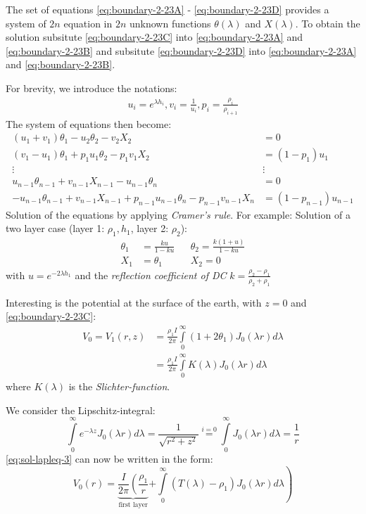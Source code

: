The set of equations \eqref{eq:boundary-2-23A} - \eqref{eq:boundary-2-23D} provides a system of $2n$ equation in $2n$ unknown functions $\theta(\lambda)$ and $X(\lambda)$. To obtain the solution subsitute \eqref{eq:boundary-2-23C} into \eqref{eq:boundary-2-23A} and \eqref{eq:boundary-2-23B} and subsitute \eqref{eq:boundary-2-23D} into \eqref{eq:boundary-2-23A} and \eqref{eq:boundary-2-23B}.

For brevity, we introduce the notations:
\begin{align*}
u_i=e^{\lambda h_i}, v_i=\frac{1}{u_i}, p_i=\frac{\rho_i}{\rho_{i+1}}
\end{align*}
The system of equations then become:
\begin{align*}
(u_1+v_1)\theta_1-u_2\theta_2-v_2X_2&=0\\
(v_1-u_1)\theta_1+p_1u_1\theta_2-p_1v_1X_2&=(1-p_1)u_1\\
\vdots~~~~~~~~~~~~~~~~~~~~&\vdots\\
u_{n-1}\theta_{n-1}+v_{n-1}X_{n-1}-u_{n-1}\theta_n&=0\\
-u_{n-1}\theta_{n-1}+v_{n-1}X_{n-1}+p_{n-1}u_{n-1}\theta_n-p_{n-1}v_{n-1}X_n&=(1-p_{n-1})u_{n-1}
\end{align*}
Solution of the equations by applying \textit{Cramer's rule}. For example: Solution of a two layer case (layer 1: $\rho_1, h_1$, layer 2: $\rho_2$):
\begin{align*}
\theta_1&=\frac{ku}{1-ku} && \theta_2=\frac{k(1+u)}{1-ku}\\
X_1&=\theta_1 && X_2=0
\end{align*}
with $u=e^{-2\lambda h_1}$ and the \textit{reflection coefficient of DC} $k=\frac{\rho_2-\rho_1}{\rho_2+\rho_1}$

Interesting is the potential at the surface of the earth, with $z=0$ and \eqref{eq:boundary-2-23C}:
\begin{align}
V_0=V_1(r,z)&=\frac{\rho_1 I}{2\pi}\int\limits_{0}^{\infty}\left(1+2\theta_1\right)J_0(\lambda r)d\lambda\\
&=\frac{\rho_1 I}{2\pi}\int\limits_{0}^{\infty}K(\lambda)J_0(\lambda r)d\lambda
\end{align}
where $K(\lambda)$ is the \textit{Slichter-function}.

We consider the Lipschitz-integral:
\begin{equation}
\int\limits_{0}^{\infty}e^{-\lambda z}J_0(\lambda r)d\lambda=\frac{1}{\sqrt{r^2+z^2}}\stackrel{i=0}= \int\limits_{0}^{\infty}J_0(\lambda r)d\lambda=\frac{1}{r}
\end{equation}
\eqref{eq:sol-lapleq-3} can now be written in the form:
\begin{equation}
V_0(r)=\underbrace{\frac{I}{2\pi}\left(\frac{\rho_1}{r}\right.}_{\textrm{first layer}}\left.+\int\limits_{0}^{\infty}(T(\lambda)-\rho_1)J_0(\lambda r)d\lambda\right)
\end{equation}

